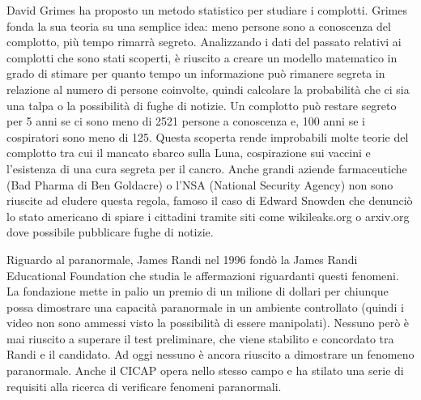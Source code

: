 \documentclass[12pt]{book} %
\begin{document}
\begin{mdframed}[linewidth=1pt]
David Grimes ha proposto un metodo statistico per studiare i
complotti. Grimes fonda la sua
teoria su una semplice idea: meno persone sono a conoscenza del complotto, più tempo rimarrà segreto.
Analizzando i dati del passato relativi ai complotti che sono stati scoperti, è riuscito a creare un modello matematico
in grado di stimare per quanto tempo un informazione può rimanere segreta in relazione al numero di persone coinvolte,
quindi calcolare la probabilità che ci sia una talpa o la possibilità di fughe di notizie.
Un complotto può restare segreto per 5 anni se ci sono meno di 2521 persone a conoscenza e, 100 anni se i cospiratori
sono meno di 125.
Questa scoperta rende improbabili molte teorie del complotto tra cui il mancato sbarco sulla Luna, cospirazione sui vaccini e l'esistenza di una cura segreta per il cancro.
Anche grandi aziende farmaceutiche (Bad Pharma di Ben
Goldacre) o
l'NSA (National Security Agency) non sono riuscite ad eludere questa regola, famoso il caso di Edward
Snowden che denunciò lo stato americano di spiare i cittadini tramite siti come wikileaks.org o arxiv.org dove
possibile pubblicare fughe di notizie.

Riguardo al paranormale, James Randi nel 1996 fondò la James Randi Educational Foundation che studia le
affermazioni riguardanti questi fenomeni. La fondazione mette in palio un premio di un milione di dollari per chiunque
possa dimostrare una capacità paranormale in un ambiente controllato (quindi i video non sono ammessi visto la possibilità di essere manipolati). 
Nessuno però è mai riuscito a superare il test preliminare, che viene
stabilito e concordato tra Randi e il candidato. Ad oggi nessuno è ancora riuscito a dimostrare un fenomeno paranormale.
Anche il CICAP opera nello stesso campo e ha stilato una serie di
requisiti alla ricerca di verificare fenomeni paranormali.
\end{mdframed}
\end{document}
